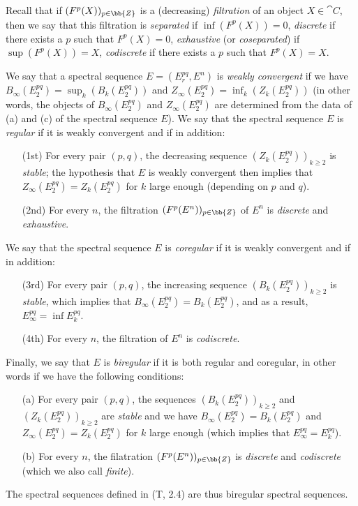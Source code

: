 \begin{env}[11.1.3]
\label{0.11.1.3}
Recall that if $(F^p(X))_{p\in\bb{Z}}$ is a (decreasing) \emph{filtration} of an object $X\in\cat{C}$, then we say that this filtration is \emph{separated} if $\inf(F^p(X))=0$, \emph{discrete} if there exists a $p$ such that $F^p(X)=0$, \emph{exhaustive} (or \emph{coseparated}) if $\sup(F^p(X))=X$, \emph{codiscrete} if there exists a $p$ such that $F^p(X)=X$.

We say that a spectral sequence $E=(E_r^{pq},E^n)$ is \emph{weakly convergent} if we have $B_\infty(E_2^{pq})=\sup_k(B_k(E_2^{pq}))$ and $Z_\infty(E_2^{pq})=\inf_k(Z_k(E_2^{pq}))$ (in other words, the objects of $B_\infty(E_2^{pq})$ and $Z_\infty(E_2^{pq})$ are determined from the data of (a) and (c) of the spectral sequence $E$).
We say that the spectral sequence $E$ is \emph{regular} if it is weakly convergent and if in addition:
\begin{enumerate}
  \item[(1st)] For every pair $(p,q)$, the decreasing sequence $(Z_k(E_2^{pq}))_{k\geq 2}$ is \emph{stable}; the hypothesis that $E$ is weakly convergent then implies that $Z_\infty(E_2^{pq})=Z_k(E_2^{pq})$ for $k$ large enough (depending on $p$ and $q$).
  \item[(2nd)] For every $n$, the filtration $(F^p(E^n))_{p\in\bb{Z}}$ of $E^n$ is \emph{discrete} and \emph{exhaustive}.
\end{enumerate}

We say that the spectral sequence $E$ is \emph{coregular} if it is weakly convergent and if in addition:
\begin{enumerate}
  \item[(3rd)] For every pair $(p,q)$, the increasing sequence $(B_k(E_2^{pq}))_{k\geq 2}$ is \emph{stable}, which implies that $B_\infty(E_2^{pq})=B_k(E_2^{pq})$, and as a result, $E_\infty^{pq}=\inf E_k^{pq}$.
  \item[(4th)] For every $n$, the filtration of $E^n$ is \emph{codiscrete}.
\end{enumerate}

Finally, we say that $E$ is \emph{biregular} if it is both regular and coregular, in other words if we have the following conditions:
\begin{enumerate}
  \item[(a)] For every pair $(p,q)$, the sequences $(B_k(E_2^{pq}))_{k\geq 2}$ and $(Z_k(E_2^{pq}))_{k\geq 2}$ are \emph{stable} and we have $B_\infty(E_2^{pq})=B_k(E_2^{pq})$ and $Z_\infty(E_2^{pq})=Z_k(E_2^{pq})$ for $k$ large enough (which implies that $E_\infty^{pq}=E_k^{pq}$).
  \item[(b)] For every $n$, the filatration $(F^p(E^n))_{p\in\bb{Z}}$ is \emph{discrete} and \emph{codiscrete} (which we also call \emph{finite}).
\end{enumerate}

The spectral sequences defined in (T, 2.4) are thus biregular spectral sequences.
\end{env}

